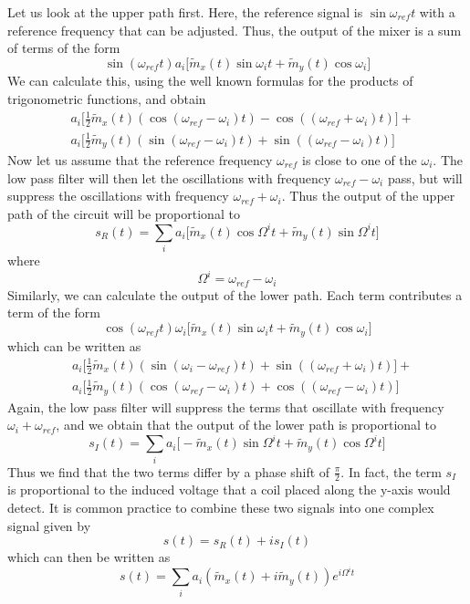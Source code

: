 \documentclass[a4paper, draft]{article}
\theoremstyle{own}
\theoremstyle{remark}
\begin{document}
Let us look at the upper path first. Here, the reference signal is $\sin \omega_{ref} t$ with a reference frequency that can be adjusted. Thus, the output of the mixer is a sum of terms of the form
$$
\sin(\omega_{ref} t) a_i \big[  \widetilde{m}_x(t) \sin \omega_i t 
 + \widetilde{m}_y(t) \cos \omega_i \big] 
$$
We can calculate this, using the well known formulas for the products of trigonometric functions, and obtain
\begin{align*}
& a_i 
\big[
\frac{1}{2} \widetilde{m}_x(t) (\cos (\omega_{ref}-\omega_i)t ) 
- \cos ((\omega_{ref} + \omega_i)t) \big] + \\
&
 a_i 
\big[
\frac{1}{2} \widetilde{m}_y(t) (\sin (\omega_{ref}-\omega_i)t ) 
+ \sin ((\omega_{ref} - \omega_i)t) \big]
\end{align*}
Now let us assume that the reference frequency $\omega_{ref}$ is close to one of the $\omega_i$. The low pass filter will then let the oscillations with frequency $\omega_{ref} - \omega_i$ pass, but will suppress the oscillations with frequency $\omega_{ref} + \omega_i$. Thus the output of the upper path of the circuit will be proportional to
$$
s_R(t) = \sum_i a_i  
\big[ 
\widetilde{m}_x(t) \cos \Omega^i t 
+
\widetilde{m}_y(t) \sin \Omega^i t 
\big] 
$$
where 
$$
\Omega^i = \omega_{ref} - \omega_i
$$
Similarly, we can calculate the output of the lower path. Each term contributes a term of the form
$$
\cos(\omega_{ref} t) \omega_i \big[  \widetilde{m}_x(t) \sin \omega_i t 
+ \widetilde{m}_y(t) \cos \omega_i \big] 
$$
which can be written as
\begin{align*}
& a_i 
\big[
\frac{1}{2} \widetilde{m}_x(t) (\sin (\omega_i - \omega_{ref})t ) 
+ \sin ((\omega_{ref} + \omega_i)t) \big] + \\
&
a_i 
\big[
\frac{1}{2} \widetilde{m}_y(t) (\cos (\omega_{ref}-\omega_i)t ) 
+ \cos ((\omega_{ref} - \omega_i)t) \big]
\end{align*}
Again, the low pass filter will suppress the terms that oscillate with frequency $\omega_i + \omega_{ref}$, and we obtain that the output of the lower path is proportional to
$$
s_I(t) = \sum_i a_i  
\big[ 
- \widetilde{m}_x(t) \sin \Omega^i t 
+
\widetilde{m}_y(t) \cos \Omega^i t 
\big] 
$$
Thus we find that the two terms differ by a phase shift of $\frac{\pi}{2}$. In fact, the term $s_I$ is proportional to the induced voltage that a coil placed along the y-axis would detect. It is common practice to combine these two signals into one complex signal given by
$$
s(t) = s_R(t) + i s_I(t)
$$
which can then be written as
$$
s(t) = \sum_i a_i (\widetilde{m}_x(t) + i \widetilde{m}_y(t)) e^{i \Omega^i t}
$$
\end{document}
